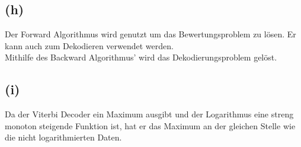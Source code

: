 \documentclass[a4paper]{scrartcl}
\begin{document}
\subsection*{(h)}
Der Forward Algorithmus wird genutzt um das Bewertungsproblem zu lösen. Er kann auch zum Dekodieren verwendet werden.
\\
Mithilfe des Backward Algorithmus' wird das Dekodierungsproblem gelöst.
\subsection*{(i)}
Da der Viterbi Decoder ein Maximum ausgibt und der Logarithmus eine streng monoton steigende Funktion ist, hat er das Maximum an der gleichen Stelle wie die nicht logarithmierten Daten.
\end{document}
